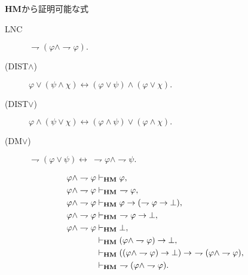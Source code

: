 	{\bf HM}から証明可能な式
	\begin{description}
		\item[LNC] $\rightharpoondown (\varphi \wedge \rightharpoondown \varphi).$
		\item[(DIST$\wedge$)] $\varphi \vee (\psi \wedge \chi) 
			\leftrightarrow (\varphi \vee \psi) \wedge (\varphi \vee \chi).$
		\item[(DIST$\vee$)] $\varphi \wedge (\psi \vee \chi) 
			\leftrightarrow (\varphi \wedge \psi) \vee (\varphi \wedge \chi).$
		\item[(DM$\vee$)] $\rightharpoondown (\varphi \vee \psi) \leftrightarrow
			\ \rightharpoondown \varphi \wedge \rightharpoondown \psi.$
	\end{description}
	
	\begin{sketch}[LNC]
		\begin{align}
			\varphi \wedge \rightharpoondown \varphi &\vdash_{{\scriptsize \mbox{{\bf HM}}}} \varphi, \\
			\varphi \wedge \rightharpoondown \varphi &\vdash_{{\scriptsize \mbox{{\bf HM}}}}\ \rightharpoondown \varphi, \\
			\varphi \wedge \rightharpoondown \varphi &\vdash_{{\scriptsize \mbox{{\bf HM}}}}
				\varphi \rightarrow (\rightharpoondown \varphi \rightarrow \bot), \\
			\varphi \wedge \rightharpoondown \varphi &\vdash_{{\scriptsize \mbox{{\bf HM}}}}\ \rightharpoondown \varphi \rightarrow \bot, \\
			\varphi \wedge \rightharpoondown \varphi &\vdash_{{\scriptsize \mbox{{\bf HM}}}} \bot, \\
			&\vdash_{{\scriptsize \mbox{{\bf HM}}}} (\varphi \wedge \rightharpoondown \varphi) \rightarrow \bot, \\
			&\vdash_{{\scriptsize \mbox{{\bf HM}}}} ((\varphi \wedge \rightharpoondown \varphi) \rightarrow \bot)
				\rightarrow\ \rightharpoondown (\varphi \wedge \rightharpoondown \varphi), \\
			&\vdash_{{\scriptsize \mbox{{\bf HM}}}}\ \rightharpoondown (\varphi \wedge \rightharpoondown \varphi).
		\end{align}
		\QED
	\end{sketch}
	
